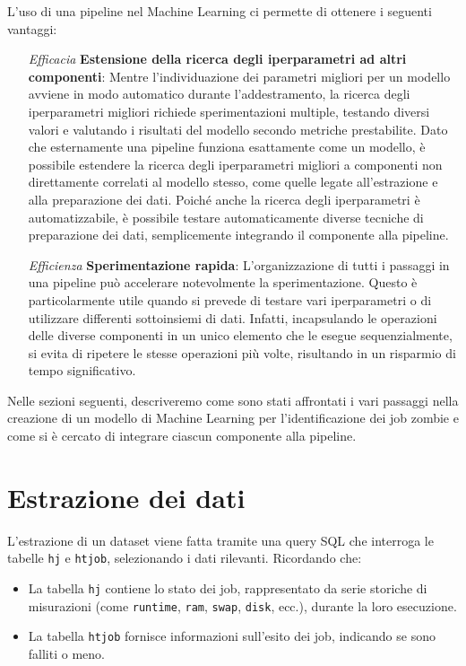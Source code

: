 L'uso di una pipeline nel Machine Learning ci permette di ottenere i seguenti
vantaggi:
\begin{itemize}
    \item[\textit{Efficacia}] \textbf{Estensione della ricerca degli iperparametri ad altri
        componenti}: Mentre l'individuazione dei parametri migliori per un
        modello avviene in modo automatico durante l'addestramento, la ricerca
        degli iperparametri migliori richiede sperimentazioni multiple,
        testando diversi valori e valutando i risultati del modello secondo
        metriche prestabilite. Dato che esternamente una pipeline funziona
        esattamente come un modello, è possibile estendere la ricerca degli
        iperparametri migliori a componenti non direttamente correlati al
        modello stesso, come quelle legate all'estrazione e alla preparazione
        dei dati. Poiché anche la ricerca degli iperparametri è
        automatizzabile, è possibile testare automaticamente diverse tecniche
        di preparazione dei dati, semplicemente integrando il componente alla
        pipeline.
    \item [\textit{Efficienza}]\textbf{Sperimentazione rapida}: L'organizzazione di tutti i
        passaggi in una pipeline può accelerare notevolmente la
        sperimentazione. Questo è particolarmente utile quando si prevede di
        testare vari iperparametri o di utilizzare differenti sottoinsiemi di
        dati. Infatti, incapsulando le operazioni delle diverse componenti in
        un unico elemento che le esegue sequenzialmente, si evita di ripetere
        le stesse operazioni più volte, risultando in un risparmio di tempo
        significativo.
\end{itemize}

Nelle sezioni seguenti, descriveremo come sono stati affrontati i vari
passaggi nella creazione di un modello di Machine Learning per
l'identificazione dei job zombie e come si è cercato di integrare ciascun
componente alla pipeline.

\section{Estrazione dei dati}

L'estrazione di un dataset viene fatta tramite una query SQL che interroga le
tabelle \texttt{hj} e \texttt{htjob}, selezionando i dati rilevanti.
Ricordando che:
\begin{itemize}
    \item La tabella \texttt{hj} contiene lo stato dei job, rappresentato da
        serie storiche di misurazioni (come \texttt{runtime}, \texttt{ram},
        \texttt{swap}, \texttt{disk}, ecc.),
        durante la loro esecuzione.
    \item La tabella \texttt{htjob} fornisce informazioni sull'esito dei job,
        indicando se sono falliti o meno.
\end{itemize}

